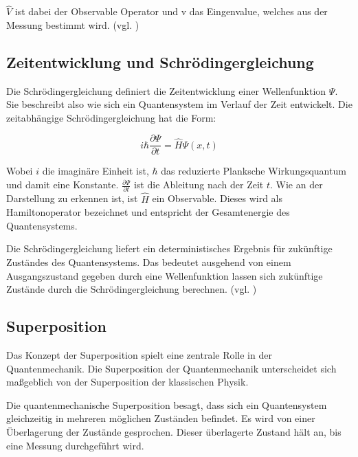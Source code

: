 $\hat{V}$ ist dabei der Observable Operator und v das Eingenvalue, welches aus der Messung bestimmt wird. (vgl. \cite[Ch. 1.9.1]{lvovsky_quantum_2018})

\subsection{Zeitentwicklung und Schrödingergleichung}
\label{Zeitentwicklung und Schrödingergleichung}

Die Schrödingergleichung definiert die Zeitentwicklung einer Wellenfunktion $\Psi$. Sie beschreibt also wie sich ein Quantensystem im Verlauf der Zeit entwickelt. Die zeitabhängige Schrödingergleichung hat die Form:


\begin{equation*}
i\hbar \frac{\partial \Psi}{\partial t} = \hat{H} \Psi(x,t)
\end{equation*}


Wobei $i$ die imaginäre Einheit ist, $\hbar$ das reduzierte Planksche Wirkungsquantum und damit eine Konstante. $\frac{\partial \Psi}{\partial t}$ ist die Ableitung nach der Zeit $t$. Wie an der Darstellung zu erkennen ist, ist $\hat{H}$ ein Observable. Dieses wird als Hamiltonoperator bezeichnet und entspricht der Gesamtenergie des Quantensystems.


Die Schrödingergleichung liefert ein deterministisches Ergebnis für zukünftige Zuständes des Quantensystems. Das bedeutet ausgehend von einem Ausgangszustand gegeben durch eine Wellenfunktion lassen sich zukünftige Zustände durch die Schrödingergleichung berechnen. (vgl. \cite[Ch. 4.1]{osada_introduction_2022})


\subsection{Superposition }
\label{sec: Superposition}

Das Konzept der Superposition spielt eine zentrale Rolle in der Quantenmechanik. Die Superposition der Quantenmechanik unterscheidet sich maßgeblich von der Superposition der klassischen Physik.


Die quantenmechanische Superposition besagt, dass sich ein Quantensystem gleichzeitig in mehreren möglichen Zuständen befindet. Es wird von einer Überlagerung der Zustände gesprochen. Dieser überlagerte Zustand hält an, bis eine Messung durchgeführt wird.


